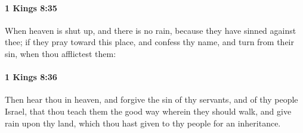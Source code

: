 		\paragraph{1 Kings 8:35} %
			\label{1KINGS-8-35}

			When heaven is shut up, and there is no rain, because they have sinned against thee; if they pray toward this place, and confess thy name, and turn from their sin, when thou afflictest them:


		\paragraph{1 Kings 8:36} %
			\label{1KINGS-8-36}

			Then hear thou in heaven, and forgive the sin of thy servants, and of thy people Israel, that thou teach them the good way wherein they should walk, and give rain upon thy land, which thou hast given to thy people for an inheritance.

